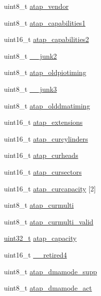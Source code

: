 \begin{DoxyCompactItemize}
\item 
uint8\_\-t \hyperlink{structataparams_a39ed493fed8549cd9684fa60ba94aeea}{atap\_\-vendor}
\item 
uint8\_\-t \hyperlink{structataparams_a1d272658b0bdb751e3fd307d62882f56}{atap\_\-capabilities1}
\item 
uint16\_\-t \hyperlink{structataparams_a14ecf759c688e530e225f5f83bb7e967}{atap\_\-capabilities2}
\item 
uint8\_\-t \hyperlink{structataparams_a3250be28b5c8489218eac638bd81fe9a}{\_\-\_\-junk2}
\item 
uint8\_\-t \hyperlink{structataparams_a2ba9479b590bdd0792bd5e2d47dbc19a}{atap\_\-oldpiotiming}
\item 
uint8\_\-t \hyperlink{structataparams_ac9f75b265f5a0b55616eaf2c2e0d0d8b}{\_\-\_\-junk3}
\item 
uint8\_\-t \hyperlink{structataparams_abfee06591f9d66ed3e19e397fd6b5907}{atap\_\-olddmatiming}
\item 
uint16\_\-t \hyperlink{structataparams_a889f469aeaa5b91b11f78d93a47c02ba}{atap\_\-extensions}
\item 
uint16\_\-t \hyperlink{structataparams_a452e93e87ba31e12b375301505825e8e}{atap\_\-curcylinders}
\item 
uint16\_\-t \hyperlink{structataparams_ae2f1b267da3bf34e5e0133e38748b239}{atap\_\-curheads}
\item 
uint16\_\-t \hyperlink{structataparams_a05851dd84a0e3ff5ebe79b08cc3dc0c6}{atap\_\-cursectors}
\item 
uint16\_\-t \hyperlink{structataparams_acfb03d619c4a09486cfa9efaa6c79374}{atap\_\-curcapacity} \mbox{[}2\mbox{]}
\item 
uint8\_\-t \hyperlink{structataparams_a4f5de807f00c4eb57cdc18c202397aa3}{atap\_\-curmulti}
\item 
uint8\_\-t \hyperlink{structataparams_adff1e9e9584894e80c012f70e6340635}{atap\_\-curmulti\_\-valid}
\item 
\hyperlink{Type_8hh_a435d1572bf3f880d55459d9805097f62}{uint32\_\-t} \hyperlink{structataparams_a0ec3c731f44748c9a0bfd19db9003af6}{atap\_\-capacity}
\item 
uint16\_\-t \hyperlink{structataparams_a8649aa1aa1e670a7293c1cfca6def78a}{\_\-\_\-retired4}
\item 
uint8\_\-t \hyperlink{structataparams_a1d90f926499b28f5a5148e6e9102af0d}{atap\_\-dmamode\_\-supp}
\item 
uint8\_\-t \hyperlink{structataparams_aa64b1c1fce4a17043e30785327eabc51}{atap\_\-dmamode\_\-act}

\end{DoxyCompactItemize}
